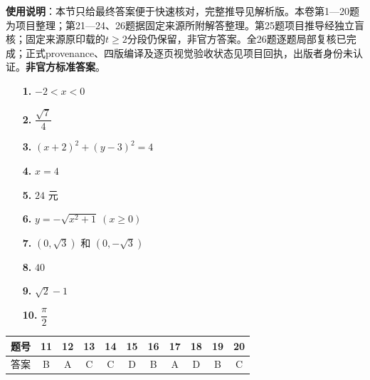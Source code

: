 
\begin{gknotice}
\textbf{使用说明}：本节只给最终答案便于快速核对，完整推导见解析版。本卷第1—20题为项目整理；第21—24、26题据固定来源所附解答整理。第25题项目推导经独立盲核；固定来源原印载的$t\ge2$分段仍保留，非官方答案。全26题逐题局部复核已完成；正式provenance、四版编译及逐页视觉验收状态见项目回执，出版者身份未认证。\textbf{非官方标准答案}。
\end{gknotice}

\begin{itemize}[leftmargin=2.6em]
  \item[\textbf{1.}] $-2<x<0$
  \item[\textbf{2.}] $\dfrac{\sqrt7}{4}$
  \item[\textbf{3.}] $(x+2)^2+(y-3)^2=4$
  \item[\textbf{4.}] $x=4$
  \item[\textbf{5.}] $24$ 元
  \item[\textbf{6.}] $y=-\sqrt{x^2+1}\ (x\ge0)$
  \item[\textbf{7.}] $(0,\sqrt3)$ 和 $(0,-\sqrt3)$
  \item[\textbf{8.}] $40$
  \item[\textbf{9.}] $\sqrt2-1$
  \item[\textbf{10.}] $\dfrac\pi2$
\end{itemize}

\begin{center}\begin{tabular}{ccccccccccc}
\toprule
题号 & 11 & 12 & 13 & 14 & 15 & 16 & 17 & 18 & 19 & 20 \\
\midrule
答案 & B & A & C & C & D & B & A & D & B & C \\
\bottomrule
\end{tabular}\end{center}

